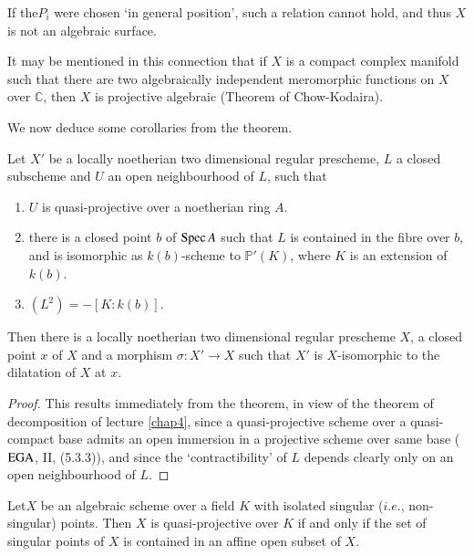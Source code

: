  If the\pageoriginale $P_i$ were chosen `in general position', such a
 relation cannot hold, and  thus $X$ is not an algebraic surface.  

It may be mentioned in this connection that if $X$ is a compact
complex manifold such that there are two algebraically independent
meromorphic functions on $X$ over $\mathbb{C}$, then $X$ is projective
algebraic (Theorem of Chow-Kodaira). 

We now deduce some corollaries from the theorem.

\setcounter{corollary}{0}
\begin{corollary}%
  Let $X'$ be a locally noetherian two dimensional regular prescheme,
  $L$ a closed subscheme and $U$ an open neighbourhood of $L$, such
  that  
  \begin{enumerate}[\rm (i)]
  \item $U$ is quasi-projective over a noetherian ring $A$.

  \item there is a closed point $b$ of $\operatorname{Spec} A$ such that $L$ is
    contained in the fibre over $b$, and is isomorphic as
    $k(b)$-scheme to $\mathbb{P}'(K)$, where $K$ is an extension of
    $k(b)$. 

  \item $(L^2)=- [ K : k(b)]$.
  \end{enumerate}
\end{corollary}  
   
Then there is a locally noetherian two dimensional regular pre\-sch\-eme
$X$, a closed point $x$ of $X$ and a morphism $\sigma :X' \rightarrow
X$ such that  $X'$ is $X$-isomorphic to the dilatation of $X$ at $x$.  
\begin{proof}
  This results immediately from the theorem, in view of the theorem of
  decomposition of lecture \ref{chap4}, since  a quasi-projective scheme over a
  quasi-compact base admits an open immersion in a projective scheme
  over same base ($\operatorname{EGA}$, II, (5.3.3)), and since the `contractibility'
  of $L$ depends clearly only on an open neighbourhood of $L$.    
\end{proof}
 
\begin{corollary}[Zariski]%
  Let\pageoriginale $X$ be an algebraic scheme over a field $K$ with isolated
  singular ($i.e.$, non-singular) points. Then $X$ is quasi-projective
  over $K$ if and only if the set of singular points of $X$ is
  contained in an affine open subset of $X$. 
\end{corollary}


